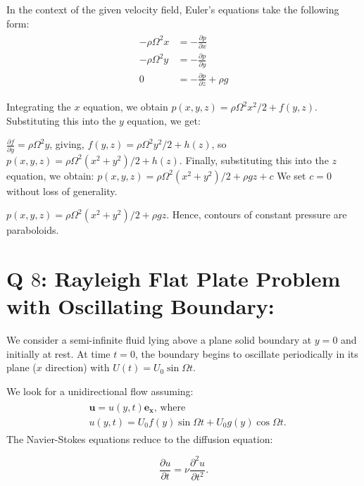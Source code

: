 \documentclass{article}
\begin{document}
In the context of the given velocity field, Euler's equations take the following form:
\begin{align}\label{eq:bucket_euler_eqns}
 \begin{split}
  -\rho \Omega^{2} x &= -\frac{\partial p}{\partial x} \\
  -\rho \Omega^{2} y  &= -\frac{\partial p}{\partial y}\\
  0 &= -\frac{\partial p}{\partial z} + \rho g
 \end{split}
\end{align}

Integrating the $x$ equation, we obtain
$p(x, y, z) = \rho \Omega^{2} x^{2}/2 + f(y, z)$. Substituting this into the $y$ equation, we get:

$\frac{\partial f}{\partial y} = \rho \Omega^{2} y$, giving, $f(y, z) = \rho \Omega^{2} y^{2}/2 + h(z)$, so $p(x, y, z) = \rho \Omega^{2} (x^{2} + y^{2})/2 + h(z)$. 
Finally, substituting this into the $z$ equation, we obtain:
$p(x, y, z) = \rho \Omega^{2} (x^{2} + y^{2})/2 + \rho g z + c$ We set $c = 0$ without loss of generality. 

$\boxed{p(x, y, z) = \rho \Omega^{2} (x^{2} + y^{2})/2 + \rho g z}$. Hence, contours of constant pressure are paraboloids. 
\section{Q $8$: Rayleigh Flat Plate Problem with Oscillating Boundary:}
We consider a semi-infinite fluid lying above a plane
solid boundary at $y = 0$ and initially at rest. At time $t = 0$, the boundary begins to oscillate
periodically in its plane ($x$ direction) with $U(t) = U_{0} \sin{\Omega t}$.

We look for a unidirectional flow assuming:
\begin{align}\label{eq:Rayleigh_flat_plate_ansatz}
 \begin{split}
  & \boldsymbol{u} = u(y, t) \boldsymbol{e_{x}} \textrm{, where}\\
  & u(y, t) = U_{0} f(y) \sin{\Omega t} + U_{0} g(y) \cos{\Omega t}.
 \end{split}
\end{align}
The Navier-Stokes equations reduce to the diffusion equation:

\begin{equation}\label{eq:diffusion}
 \frac{\partial u}{\partial t} = \nu \frac{\partial^{2} u}{\partial t^{2}}.
\end{equation}
\end{document}
